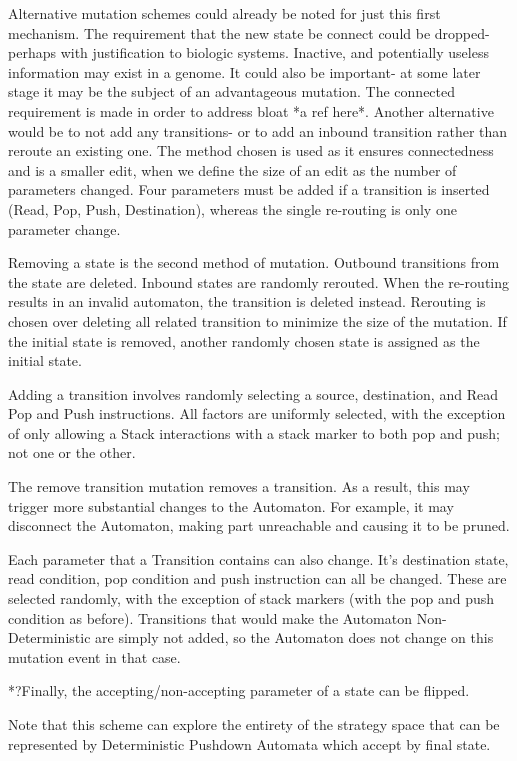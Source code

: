 \documentclass[a4paper,11pt,bcshonoursthesis,singlespace,twoside]{cssethesis}
\begin{document}
Alternative mutation schemes could already be noted for just this first mechanism. 
The requirement that the new state be connect could be dropped- perhaps with justification to biologic systems. Inactive, and potentially useless information may exist in a genome. 
It could also be important- at some later stage it may be the subject of an advantageous mutation. 
The connected requirement is made in order to address bloat *a ref here*. 
Another alternative would be to not add any transitions- or to add an inbound transition rather than reroute an existing one. The method chosen is used as it ensures connectedness and is a smaller edit, when we define the size of an edit as the number of parameters changed. Four parameters must be added if a transition is inserted (Read, Pop, Push, Destination), whereas the single re-routing is only one parameter change.

Removing a state is the second method of mutation. Outbound transitions from the state are deleted. 
Inbound states are randomly rerouted. When the re-routing results in an invalid automaton, the transition is deleted instead. Rerouting is chosen over deleting all related transition to minimize the size of the mutation. If the initial state is removed, another randomly chosen state is assigned as the initial state.

Adding a transition involves randomly selecting a source, destination, and Read Pop and Push instructions. All factors are uniformly selected, with the exception of only allowing a Stack interactions with a stack marker to both pop and push; not one or the other. 

The remove transition mutation removes a transition. As a result, this may trigger more substantial changes to the Automaton. For example, it may disconnect the Automaton, making part unreachable and causing it to be pruned. 

Each parameter that a Transition contains can also change. It's destination state, read condition, pop condition and push instruction can all be changed. These are selected randomly, with the exception of stack markers (with the pop and push condition as before). Transitions that would make the Automaton Non-Deterministic are simply not added, so the Automaton does not change on this mutation event in that case.

*?Finally, the accepting/non-accepting parameter of a state can be flipped.

Note that this scheme can explore the entirety of the strategy space that can be represented by Deterministic Pushdown Automata which accept by final state. 
\end{document}
